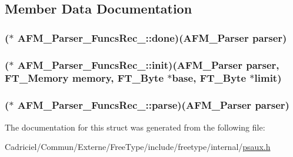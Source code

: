 \subsection{Member Data Documentation}
\hypertarget{struct_a_f_m___parser___funcs_rec___af4e8bc33b14d14b47d13caf0a2449d1b}{
\subsubsection[{done}]{($\ast$ A\-F\-M\-\_\-\-Parser\-\_\-\-Funcs\-Rec\-\_\-\-::done)({\bf A\-F\-M\-\_\-\-Parser} parser)}}\label{struct_a_f_m___parser___funcs_rec___af4e8bc33b14d14b47d13caf0a2449d1b}
\hypertarget{struct_a_f_m___parser___funcs_rec___a7d5c1422c71ef00984f1207ebfb0b082}{
\subsubsection[{init}]{($\ast$ A\-F\-M\-\_\-\-Parser\-\_\-\-Funcs\-Rec\-\_\-\-::init)({\bf A\-F\-M\-\_\-\-Parser} parser, {\bf F\-T\-\_\-\-Memory} memory, {\bf F\-T\-\_\-\-Byte} $\ast$base, {\bf F\-T\-\_\-\-Byte} $\ast${\bf limit})}}\label{struct_a_f_m___parser___funcs_rec___a7d5c1422c71ef00984f1207ebfb0b082}
\hypertarget{struct_a_f_m___parser___funcs_rec___a2cd41be89cf12f9227c6f18220cbe2f3}{
\subsubsection[{parse}]{($\ast$ A\-F\-M\-\_\-\-Parser\-\_\-\-Funcs\-Rec\-\_\-\-::parse)({\bf A\-F\-M\-\_\-\-Parser} parser)}}\label{struct_a_f_m___parser___funcs_rec___a2cd41be89cf12f9227c6f18220cbe2f3}


The documentation for this struct was generated from the following file\-:\begin{DoxyCompactItemize}
\item 
Cadriciel/\-Commun/\-Externe/\-Free\-Type/include/freetype/internal/\hyperlink{psaux_8h}{psaux.\-h}\end{DoxyCompactItemize}
